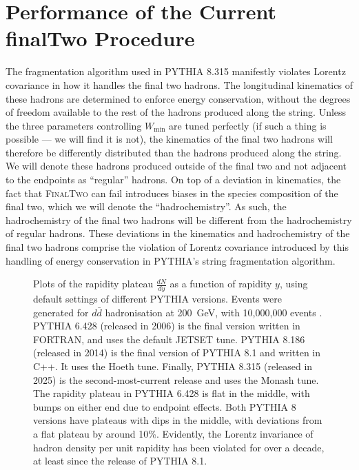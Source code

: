 \documentclass[12pt,a4paper]{report}
\begin{document}
\section{Performance of the Current finalTwo Procedure}
\label{sec:performance}
The fragmentation algorithm used in PYTHIA 8.315 manifestly violates Lorentz covariance in how it handles the final two hadrons. The longitudinal kinematics of these hadrons are determined to enforce energy conservation, without the degrees of freedom available to the rest of the hadrons produced along the string. Unless the three parameters controlling $W_\text{min}$ are tuned perfectly (if such a thing is possible --- we will find it is not), the kinematics of the final two hadrons will therefore be differently distributed than the hadrons produced along the string. We will denote these hadrons produced outside of the final two and not adjacent to the endpoints as ``regular'' hadrons. On top of a deviation in kinematics, the fact that \textsc{FinalTwo} can fail introduces biases in the species composition of the final two, which we will denote the ``hadrochemistry''. As such, the hadrochemistry of the final two hadrons will be different from the hadrochemistry of regular hadrons. These deviations in the kinematics and hadrochemistry of the final two hadrons comprise the violation of Lorentz covariance introduced by this handling of energy conservation in PYTHIA's string fragmentation algorithm.

\begin{figure}
  \centering
  
  \caption{Plots of the rapidity plateau $\frac{dN}{dy}$ as a function of rapidity $y$, using default settings of different PYTHIA versions. Events were generated for $d\bar{d}$ hadronisation at \qty{200}{\giga\electronvolt}, with 10,000,000 events \protect\footnotemark. PYTHIA 6.428 (released in 2006) is the final version written in FORTRAN, and uses the default JETSET tune. PYTHIA 8.186 (released in 2014) is the final version of PYTHIA 8.1 and written in C++. It uses the Hoeth tune. Finally, PYTHIA 8.315 (released in 2025) is the second-most-current release and uses the Monash tune. The rapidity plateau in PYTHIA 6.428 is flat in the middle, with bumps on either end due to endpoint effects. Both PYTHIA 8 versions have plateaus with dips in the middle, with deviations from a flat plateau by around 10\%. Evidently, the Lorentz invariance of hadron density per unit rapidity has been violated for over a decade, at least since the release of PYTHIA 8.1.}
  \label{fig:version-plots}
\end{figure}
\end{document}
